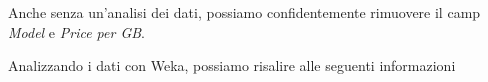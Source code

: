 \documentclass[12pt]{report}
\begin{document}
Anche senza un'analisi dei dati, possiamo confidentemente rimuovere il camp \textit{Model} e \textit{Price per GB}.

Analizzando i dati con Weka, possiamo risalire alle seguenti informazioni
%
\end{document}
